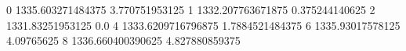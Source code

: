 0 1335.603271484375 3.770751953125
1 1332.207763671875 0.375244140625
2 1331.83251953125 0.0
4 1333.6209716796875 1.7884521484375
6 1335.93017578125 4.09765625
8 1336.660400390625 4.827880859375
